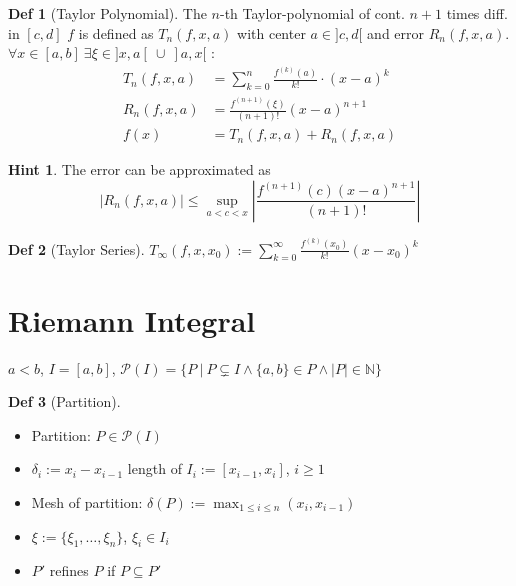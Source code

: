 \documentclass[a4paper, 10pt]{article}
\theoremstyle{definition}
\newtheorem*{definition}{Def}
\newtheorem*{note_wrapper}{Hint}
\theoremstyle{ex}
\theoremstyle{named}
\newenvironment{note}%
    {\begin{mdframed}[style=trick]\begin{note_wrapper}}%
    {\end{note_wrapper}\end{mdframed}}
\newcommand{\N}{\mathbb{N}}
\begin{document}
\begin{definition}[Taylor Polynomial]
    The $n$-th Taylor-polynomial of cont. $n + 1$ times diff. in $[c, d]$ $f$ is defined as $T_n(f, x, a)$ with center $a \in ]c, d[$ and error $R_n(f, x, a)$. \\ 
    $\forall x \in [a, b] \ \exists \xi \in ]x, a[ \ \cup \ ]a, x[$ : 
    \begin{align*}
        T_n(f, x, a) &= \sum_{k = 0}^n \frac{f^{(k)}(a)}{k!} \cdot (x - a)^k \\
        R_n(f, x, a) &= \frac{f^{(n+1)}(\xi)}{(n + 1)!}(x-a)^{n+1} \\
        f(x) &= T_n(f, x, a) + R_n(f, x, a)
    \end{align*}
\end{definition}

\begin{note}
    The error can be approximated as
    $$|R_n(f, x, a)| \leq \sup_{a < c < x}\left|\frac{f^{(n + 1)}(c)(x-a)^{n+1}}{(n+1)!}\right|$$
\end{note}

\begin{definition}[Taylor Series]
    $T_\infty(f, x, x_0) := \sum_{k = 0}^\infty \frac{f^{(k)}(x_0)}{k!}(x-x_0)^k$
\end{definition}

\section{Riemann Integral}
\begin{center}
    $a < b$, $I = [a, b]$, $\mathcal{P}(I) = \{P \ | \ P \subsetneq I \land \{a, b\} \in P \land |P| \in \N \}$
\end{center}
\begin{definition}[Partition]
    \begin{itemize}
        \item Partition:  $P \in \mathcal{P}(I)$
        \item $\delta_i := x_i - x_{i-1}$ length of $I_i := [x_{i-1}, x_i]$, $i \geq 1$
        \item Mesh of partition: $\delta(P) := \max_{1 \leq i \leq n}(x_i, x_{i - 1})$
        \item $\xi := \{\xi_1, \ldots, \xi_n\}$, $\xi_i \in I_i$
        \item $P'$ refines $P$ if $P \subseteq   P'$
    \end{itemize}
\end{definition}
\end{document}
